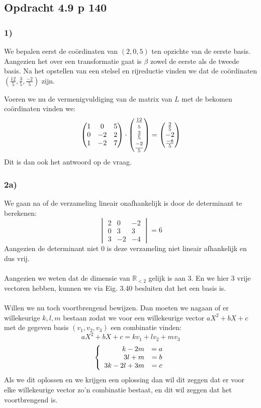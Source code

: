 \documentclass[lineaire_algebra_oplossingen.tex]{subfiles}
\begin{document}
\subsection{Opdracht 4.9 p 140}
\label{4.9}

\subsubsection*{1)}
We bepalen eerst de co\"ordinaten van $(2,0,5)$ ten opzichte van de eerste basis. Aangezien het over een transformatie gaat is $\beta$ zowel de eerste als de tweede basis. 
Na het opstellen van een stelsel en rijreductie vinden we dat de co\"ordinaten $\left(\frac{12}{5},\frac{3}{5},\frac{-2}{5}\right)$ zijn.

Voeren we nu de vermenigvuldiging van de matrix van $L$ met de bekomen co\"ordinaten vinden we:\\
$$
\begin{pmatrix}
1&0&5\\
0&-2&2\\
1&-2&7
\end{pmatrix}
\cdot
\begin{pmatrix}
\frac{12}{\strut5}\\ \frac{3}{5}\\ \frac{\strut -2}{5}
\end{pmatrix}
=
\begin{pmatrix}
\strut \frac{2}{5}\\ -2\\ \strut \frac{-8}{5}
\end{pmatrix}
$$
Dit is dan ook het antwoord op de vraag.

\subsubsection*{2a)}
We gaan na of de verzameling lineair onafhankelijk is door de determinant te berekenen:
$$
\begin{vmatrix}
2 & 0 & -2\\
0&3&3\\
3&-2&-4
\end{vmatrix}
= 6
$$
Aangezien de determinant niet 0 is deze verzameling niet lineair afhankelijk en dus vrij.
\\
\\
Aangezien we weten dat de dimensie van $\mathbb{R}_{<2}$ gelijk is aan 3. En we hier 3 vrije vectoren hebben, kunnen we via Eig. 3.40 besluiten dat het een basis is.
\\
\\
Willen we nu toch voortbrengend bewijzen. Dan moeten we nagaan of er willekeurige $k,l,m$ bestaan zodat we voor een willekeurige vector $aX^2+bX+c$ met de gegeven basis $(v_1,v_2,v_3)$ een combinatie vinden:
$$
aX^2+bX+c = kv_1+lv_2+mv_3
$$
$$
\left\lbrace
\begin{array}{r c}
k-2m &= a\\
3l+m &= b\\
3k-2l+3m &= c
\end{array}
\right.
$$
Als we dit oplossen en we krijgen een oplossing dan wil dit zeggen dat er voor elke willekeurige vector zo'n combinatie bestaat, en dit wil zeggen dat het voortbrengend is.
\end{document}
